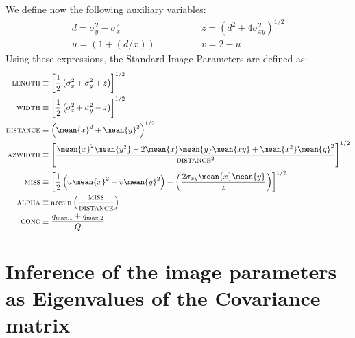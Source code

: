 We define now the following auxiliary variables:
%
\begin{equation}
\label{eq:auxiliary}
\begin{split}
  d = \sigma_y^2 - \sigma_x^2 &\qquad\qquad
  z = \left(d^2+4\sigma_{xy}^2\right)^{1/2} \\
  u = \left(1+(d/x)\right) &\qquad\qquad
  v = 2 - u
\end{split}
\end{equation}
Using these expressions, the Standard Image Parameters are defined as:
%
\begin{subequations}
  \label{eq:imageparams}
  \begin{align}
%
    \label{eq:lengthdef}
    \text{\scshape length} &\equiv 
    \left[\frac{1}{2}\left(\sigma_x^2+\sigma_y^2+z\right)\right]^{1/2}\\
%
    \label{eq:widthdef}
    \text{\scshape width} &\equiv 
    \left[\frac{1}{2}\left(\sigma_x^2+\sigma_y^2-z\right)\right]^{1/2}\\
%
    \label{eq:distdef}
    \text{\scshape distance} &\equiv 
    \left(\mean{x}^2 + \mean{y}^2\right)^{1/2}\\
%
    \label{eq:azwidthdef}
    \text{\scshape azwidth} &\equiv 
    \left[\frac{\mean{x}^2\mean{y^2} 
        - 2\mean{x}\mean{y}\mean{xy} 
        + \mean{x^2}\mean{y}^2}{\text{\scshape distance}^2}\right]^{1/2}\\
%
    \label{eq:missdef}
    \text{\scshape miss} &\equiv 
    \left[\frac{1}{2}\left(u\mean{x}^2 + v\mean{y}^2\right)
        - \left(\frac{2\sigma_{xy}\mean{x}\mean{y}}{z}\right)\right]^{1/2}\\
%
    \label{eq:alphadef}
    \text{\scshape alpha} &\equiv
    \arcsin\left(\frac{\text{\scshape miss}}{\text{\scshape distance}}\right)\\
%
    \label{eq:concdef}
    \text{\scshape conc} &\equiv
    \frac{q_{\mathrm{max.1}} + q_{\mathrm{max.2}}}{Q}
%
  \end{align}
\end{subequations}

\imageparaxesfig


\section{Inference of the image parameters as Eigenvalues of the 
  Covariance matrix}


